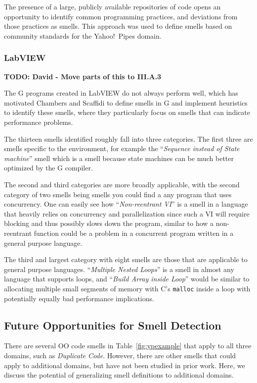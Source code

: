\documentclass[10pt,conference,compsocconf]{IEEEtran}
\newcommand{\todo}[1]{\textbf{TODO: #1}}
\begin{document}
The presence of a large, publicly available repositories of code opens an opportunity to identify common programming practices, and deviations from those practices as smells. This approach was used to define smells based on community standards for the Yahoo!\ Pipes domain. 



\subsubsection{LabVIEW}

\todo{David - Move parts of this to III.A.3}

The G programs created in LabVIEW do not always perform well, which has motivated Chambers and Scaffidi \cite{chambers2013smell} to define smells in G and implement heuristics to identify these smells, where they particularly focus on smells that can indicate performance problems.

The thirteen smells identified roughly fall into three categories.
The first three are smells specific to the environment, for example the ``\textit{Sequence instead of State machine}'' smell which is a smell because state machines can be much better optimized by the G compiler.

The second and third categories are more broadly applicable, with the second category of two smells being smells you could find a any program that uses concurrency.
One can easily see how ``\textit{Non-reentrant VI}'' is a smell in a language that heavily relies on concurrency and parallelization since such a VI will require blocking and thus possibly slows down the program, similar to how a non-reentrant function could be a problem in a concurrent program written in a general purpose language.

The third and largest category with eight smells are those that are applicable to general purpose languages.
``\textit{Multiple Nested Loops}'' is a smell in almost any language that supports loops, and ``\textit{Build Array inside Loop}'' would be similar to allocating multiple small segments of memory with C's \texttt{malloc} inside a loop with potentially equally bad performance implications.

\subsection{Future Opportunities for Smell Detection}
There are several OO code smells in Table~\ref{fig:ypexample} that apply to all three domains, such as \emph{Duplicate Code}. However, there are other smells that could apply to additional domains, but have not been studied in prior work. Here, we discuss the potential of generalizing smell definitions to additional domains. 
\end{document}
